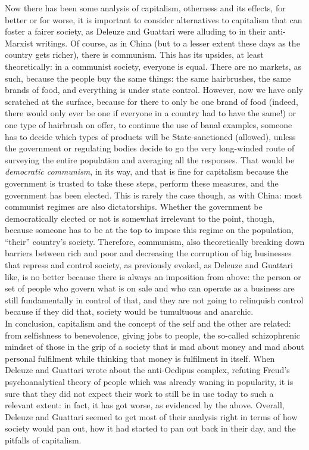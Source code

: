 \documentclass[12pt,a4paper]{article}
\begin{document}
Now there has been some analysis of capitalism, otherness and its
effects, for better or for worse, it is important to consider
alternatives to capitalism that can foster a fairer society, as
Deleuze and Guattari were alluding to in their anti-Marxist writings.
Of course, as in China (but to a lesser extent these days as the
country gets richer), there is communism. This has its upsides, at
least theoretically: in a communist society, everyone is equal. There
are no markets, as such, because the people buy the same things: the
same hairbrushes, the same brands of food, and everything is under
state control. However, now we have only scratched at the surface,
because for there to only be one brand of food (indeed, there would
only ever be one if everyone in a country had to have the same!) or
one type of hairbrush on offer, to continue the use of banal
examples, someone has to decide which types of products will be
State-sanctioned (allowed), unless the government or regulating bodies
decide to go the very long-winded route of surveying the entire
population and averaging all the responses. That would be
\textit{democratic communism}, in its way, and that is fine for
capitalism because the government is trusted to take these steps,
perform these measures, and the government has been elected. This is
rarely the case though, as with China: most communist regimes are also
dictatorships. Whether the government be democratically elected or not
is somewhat irrelevant to the point, though, because someone has to be
at the top to impose this regime on the population, ``their''
country's society. Therefore, communism, also theoretically breaking
down barriers between rich and poor and decreasing the corruption of
big businesses that repress and control society, as previously
evoked, as Deleuze and Guattari like, is no better because there is
always an imposition from above: the person or set of people who
govern what is on sale and who can operate as a business are still
fundamentally in control of that, and they are not going to relinquish
control because if they did that, society would be tumultuous and
anarchic.\\

In conclusion, capitalism and the concept of the self and the other
are related: from selfishness to benevolence, giving jobs to people,
the so-called schizophrenic mindset of those in the grip of a society
that is mad about money and mad about personal fulfilment while
thinking that money is fulfilment in itself. When Deleuze and Guattari
wrote about the anti-Oedipus complex, refuting Freud's
psychoanalytical theory of people which was already waning in
popularity, it is sure that they did not expect their work to still be
in use today to such a relevant extent: in fact, it has got worse, as
evidenced by the above. Overall, Deleuze and Guattari seemed to get
most of their analysis right in terms of how society would pan out,
how it had started to pan out back in their day, and the pitfalls of
capitalism.

\cite{*}


\end{document}
